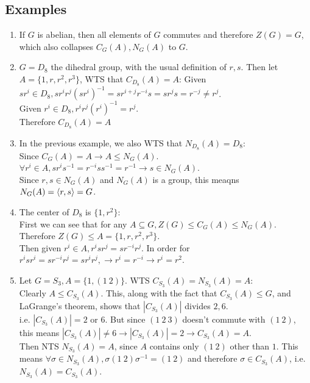 \documentclass{article}
\begin{document}
\subsection*{Examples}
\begin{enumerate}
    \item If $G$ is abelian, then all elements of $G$ commutes and therefore $Z(G) = G$, which also collapses $C_G(A), N_G(A)$ to $G$.
    \item $G = D_8$ the dihedral group, with the usual definition of $r, s$. Then let $A = \{1, r, r^2, r^3\}$, WTS that $C_{D_8}(A) = A$:
    Given $sr^i \in D_8, sr^ir^j(sr^i)^{-1} = sr^{i+j}r^{-i}s = sr^js = r^{-j} \neq r^j$.\\
    Given $r^i \in D_8, r^ir^j(r^i)^{-1} = r^j$.\\
    Therefore $C_{D_8}(A) = A$
    \item In the previous example, we also WTS that $N_{D_8}(A) = D_8$:\\
    Since $C_G(A) = A \rightarrow A \leq N_G(A)$.\\
    $\forall r^i \in A, sr^is^{-1} = r^{-i}ss^{-1} = r^{-1} \rightarrow s \in N_G(A)$.\\
    Since $r, s \in N_G(A)$ and $N_G(A)$ is a group, this meaqns $N_G(A) = \braket{r, s} = G$.
    \item The center of $D_8$ is $\{1, r^2\}$:\\
    First we can see that for any $A \subseteq G, Z(G) \leq C_G(A) \leq N_G(A)$. Therefore $Z(G) \leq A = \{1, r, r^2, r^3\}$.\\
    Then given $r^i \in A, r^isr^j = sr^{-i}r^j$. In order for $r^isr^i = sr^{-i}r^j = sr^ir^j, \rightarrow r^i = r^{-i} \rightarrow r^i = r^2$.
    \item Let $G = S_3, A = \{1, (1\ 2)\}$. WTS $C_{S_3}(A) = N_{S_3}(A) = A$:\\
    Clearly $A \leq C_{S_3}(A)$. This, along with the fact that $C_{S_3}(A) \leq G$, and LaGrange's theorem, shows that $|C_{S_3}(A)|$ divides $2, 6$.\\
    i.e. $|C_{S_3}(A)| = 2$ or $6$. But since $(1\ 2\ 3)$ doesn't commute with $(1\ 2)$, this means $|C_{S_3}(A)| \neq 6 \rightarrow |C_{S_3}(A)| = 2 \rightarrow C_{S_3}(A) = A$.\\
    Then NTS $N_{S_3}(A) = A$, since $A$ contains only $(1\ 2)$ other than $1$. This means $\forall \sigma \in N_{S_3}(A), \sigma(1\ 2)\sigma^{-1} = (1\ 2)$ and therefore $\sigma \in C_{S_3}(A)$, i.e. $N_{S_3}(A) = C_{S_3}(A)$.
\end{enumerate}
\end{document}
